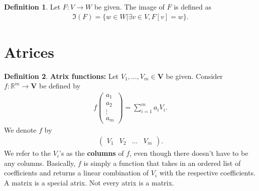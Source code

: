 \documentclass{book}
\theoremstyle{definition}
\newtheorem{defn}{Definition}[section]
\newcommand{\R}{\mathbb{R}}
\begin{document}
\begin{defn}
	Let $F : V \rightarrow W$ be given. The image of $F$ is defined as
	\begin{align*}
	\Im(F) = \{w\in W \vert \exists v\in V, F[v] = w \}. 
	\end{align*}
\end{defn}
\section{Atrices}
\begin{defn}
	\textbf{Atrix functions:} Let $V_1,\dots,V_m \in \mathbf{V}$ be given. Consider $f : \R^m \rightarrow \mathbf{V}$ be defined by
	\begin{align*}
	f\begin{pmatrix}
	a_1\\
	a_2\\
	\vdots\\
	a_m
	\end{pmatrix}
	=
	\sum_{i=1}^m a_i V_i.
	\end{align*} 
	We denote $f$ by
	\begin{align*}
	\begin{pmatrix}
	V_1 & V_2 &\dots& V_m
	\end{pmatrix}.
	\end{align*}
	We refer to the $V_i$'s as the \textbf{columns} of $f$, even though there doesn't have to be any columns. Basically, $f$ is simply a function that takes in an ordered list of coefficients and returns a linear combination of $V_i$ with the respective coefficients. A matrix is a special atrix. Not every atrix is a matrix. 
\end{defn}
\end{document}
